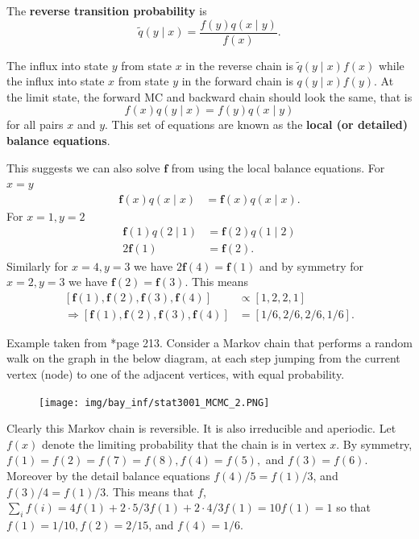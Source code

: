 \begin{defe} \label{defe: rtp}
    The {\bf reverse transition probability} is
    \[
        \tilde{q} (y \mid x) = \frac{f(y) q(x \mid y)}{f(x)}.
    \]
\end{defe}

The influx into state $y$ from state $x$ in the reverse chain is $\tilde{q} (y \mid x) f(x)$ while the influx into state $x$ from state $y$ in the forward chain is $q (y \mid x) f(y)$. At the limit state, the forward MC and backward chain should look the same, that is
\begin{equation*}
    f(x) q(y \mid x) = f(y) q (x \mid y)
\end{equation*}
for all pairs $x$ and $y$. This set of equations are known as the {\bf local (or detailed) balance equations}.

\begin{exam}  \label{exam: mc_state_intro_cont_2}
    This suggests we can also solve $\bm{f}$ from  using the local balance equations. For $x=y$
    \begin{align*}
        \bm{f} (x) q(x \mid x) & = \bm{f} (x) q(x \mid x).
    \end{align*}
    For $x= 1, y=2$
    \begin{align*}
        \bm{f}(1) q (2 \mid 1) & = \bm{f}(2) q(1 \mid 2) \\
        2 \bm{f}(1)            & = \bm{f}(2).
    \end{align*}
    Similarly for $x=4, y=3$ we have $2 \bm{f}(4) = \bm{f}(1)$ and by symmetry for $x=2, y=3$ we have $\bm{f}(2) = \bm{f}(3)$. This means
    \begin{align*}
        \left[ \bm{f}(1), \bm{f}(2), \bm{f}(3), \bm{f}(4) \right]             & \propto \left[ 1,2,2,1 \right]    \\
        \Rightarrow \left[ \bm{f}(1), \bm{f}(2), \bm{f}(3), \bm{f}(4) \right] & = \left[ 1/6,2/6,2/6,1/6 \right].
    \end{align*}
\end{exam}

\begin{exam} \label{exam: mcmc_lbe_2}
    Example taken from \cite{KroeseDirkP2013SMaC}*{page 213}. Consider a Markov chain that performs a random walk on the graph in the below diagram, at each step jumping from the current vertex (node) to one of the adjacent vertices, with equal probability.
    \begin{figure}[H]
        \centering
        \texttt{[image: img/bay\_inf/stat3001\_MCMC\_2.PNG]}
        \label{fig: MCMC_ex2}
    \end{figure}
    Clearly this Markov chain is reversible. It is also irreducible and aperiodic. Let $f(x)$ denote the limiting probability that the chain is in vertex $x$. By symmetry, $f(1) = f(2) = f(7) = f(8), f(4) = f(5),$ and $f(3) = f(6)$. Moreover by the detail balance equations $f(4) / 5 = f(1)/3$, and $f(3)/4 = f(1)/3$. This means that $f$, $\sum_i f(i) = 4 f(1) + 2 \cdot 5/3 f(1) + 2 \cdot 4/3 f(1) = 10 f(1) = 1$ so that $f(1) = 1/10, f(2) = 2/15$, and $f(4) = 1/6$.
\end{exam}

